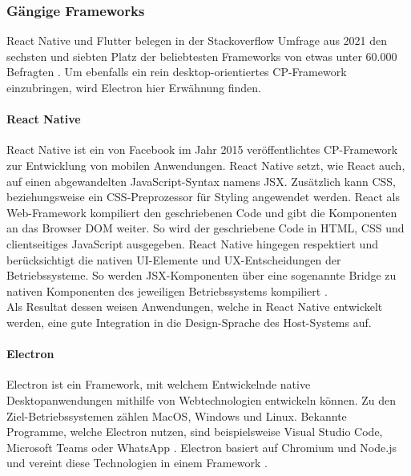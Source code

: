 \documentclass[a4paper]{scrartcl}
\begin{document}
\subsubsection{Gängige Frameworks}

React Native und Flutter belegen in der Stackoverflow Umfrage aus 2021 den sechsten und siebten Platz der beliebtesten Frameworks von etwas unter 60.000 Befragten \autocite{stackoverflow_2021}. Um ebenfalls ein rein desktop-orientiertes CP-Framework einzubringen, wird Electron hier Erwähnung finden.

\paragraph{React Native}

React Native ist ein von Facebook im Jahr 2015 veröffentlichtes CP-Framework zur Entwicklung von mobilen Anwendungen. React Native setzt, wie React auch, auf einen abgewandelten JavaScript-Syntax namens JSX. Zusätzlich kann CSS, beziehungsweise ein CSS-Preprozessor für Styling angewendet werden. React als Web-Framework kompiliert den geschriebenen Code und gibt die Komponenten an das Browser DOM weiter. So wird der geschriebene Code in HTML, CSS und clientseitiges JavaScript ausgegeben. React Native hingegen respektiert und berücksichtigt die nativen UI-Elemente und UX-Entscheidungen der Betriebssysteme. So werden JSX-Komponenten über eine sogenannte Bridge zu nativen Komponenten des jeweiligen Betriebssystems kompiliert \autocite[10f.]{React_Native_Danielsson}. \\
Als Resultat dessen weisen Anwendungen, welche in React Native entwickelt werden, eine gute Integration in die Design-Sprache des Host-Systems auf.

\paragraph{Electron}

Electron ist ein Framework, mit welchem Entwickelnde native Desktopanwendungen mithilfe von Webtechnologien entwickeln können. Zu den Ziel-Betriebssystemen zählen MacOS, Windows und Linux. Bekannte Programme, welche Electron nutzen, sind beispielsweise Visual Studio Code, Microsoft Teams oder WhatsApp \autocite{Electron.js}. Electron basiert auf Chromium und Node.js und vereint diese Technologien in einem Framework \autocite[Jasim 2017, zitiert nach][572]{Electron_Kredpattanakul}. \\
\end{document}
